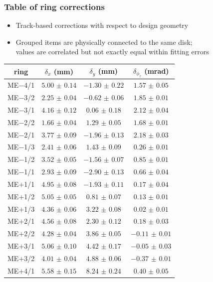 \documentclass[compress]{beamer}
\begin{document}
\begin{frame}
\frametitle{Table of ring corrections}
\begin{itemize}
\item Track-based corrections with respect to design geometry
\item Grouped items are physically connected to the same disk; \\ values are correlated but not exactly equal within fitting errors
\end{itemize}

\vspace{-0.5 cm}
\begin{center}
\scriptsize
\renewcommand{\arraystretch}{1.1}
\begin{tabular}{c | c c c}
ring & $\delta_x$ (mm) & $\delta_y$ (mm) & $\delta_{\phi_z}$ (mrad) \\\hline
ME$-$4/1 & $ 5.00$ $\pm$ $ 0.14$ & $-1.30$ $\pm$ $ 0.22$ & $ 1.57$ $\pm$ $ 0.05$ \\\hline
ME$-$3/2 & $ 2.25$ $\pm$ $ 0.04$ & $-0.62$ $\pm$ $ 0.06$ & $ 1.85$ $\pm$ $ 0.01$ \\
ME$-$3/1 & $ 4.16$ $\pm$ $ 0.12$ & $ 0.06$ $\pm$ $ 0.18$ & $ 2.12$ $\pm$ $ 0.04$ \\
ME$-$2/2 & $ 1.66$ $\pm$ $ 0.04$ & $ 1.29$ $\pm$ $ 0.05$ & $ 1.68$ $\pm$ $ 0.01$ \\
ME$-$2/1 & $ 3.77$ $\pm$ $ 0.09$ & $-1.96$ $\pm$ $ 0.13$ & $ 2.18$ $\pm$ $ 0.03$ \\\hline
ME$-$1/3 & $ 2.41$ $\pm$ $ 0.06$ & $ 1.43$ $\pm$ $ 0.09$ & $ 0.26$ $\pm$ $ 0.01$ \\
ME$-$1/2 & $ 3.52$ $\pm$ $ 0.05$ & $-1.56$ $\pm$ $ 0.07$ & $ 0.85$ $\pm$ $ 0.01$ \\
ME$-$1/1 & $ 2.93$ $\pm$ $ 0.09$ & $-2.90$ $\pm$ $ 0.13$ & $ 0.66$ $\pm$ $ 0.04$ \\\hline
ME$+$1/1 & $ 4.95$ $\pm$ $ 0.08$ & $-1.93$ $\pm$ $ 0.11$ & $ 0.17$ $\pm$ $ 0.04$ \\
ME$+$1/2 & $ 5.05$ $\pm$ $ 0.05$ & $ 0.81$ $\pm$ $ 0.07$ & $ 0.13$ $\pm$ $ 0.01$ \\
ME$+$1/3 & $ 4.36$ $\pm$ $ 0.06$ & $ 3.22$ $\pm$ $ 0.08$ & $ 0.02$ $\pm$ $ 0.01$ \\\hline
ME$+$2/1 & $ 4.56$ $\pm$ $ 0.08$ & $ 2.30$ $\pm$ $ 0.12$ & $ 0.18$ $\pm$ $ 0.03$ \\
ME$+$2/2 & $ 4.28$ $\pm$ $ 0.04$ & $ 3.86$ $\pm$ $ 0.05$ & $-0.11$ $\pm$ $ 0.01$ \\
ME$+$3/1 & $ 5.06$ $\pm$ $ 0.10$ & $ 4.42$ $\pm$ $ 0.17$ & $-0.05$ $\pm$ $ 0.03$ \\
ME$+$3/2 & $ 4.01$ $\pm$ $ 0.04$ & $ 4.88$ $\pm$ $ 0.06$ & $-0.37$ $\pm$ $ 0.01$ \\\hline
ME$+$4/1 & $ 5.58$ $\pm$ $ 0.15$ & $ 8.24$ $\pm$ $ 0.24$ & $ 0.40$ $\pm$ $ 0.05$ \\
\end{tabular}
\end{center}
\end{frame}
\end{document}

